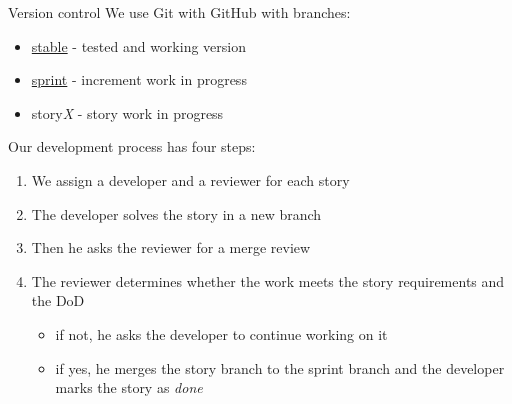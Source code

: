 \documentclass{beamer}
\begin{document}
\begin{frame}{Version control}
  We use Git with GitHub with branches:

  \begin{itemize}
  \item \href{https://github.com/smarisa/sdpt11}{stable} - tested and working version
  \item \href{https://github.com/smarisa/sdpt11}{sprint} - increment work in progress
  \item story\emph{X} - story work in progress
  \end{itemize}

  Our development process has four steps:

  \begin{enumerate}
  \item We assign a developer and a reviewer for each story
  \item The developer solves the story in a new branch
  \item Then he asks the reviewer for a merge review
  \item The reviewer determines whether the work meets the story
  requirements and the DoD
    \begin{itemize}
    \item if not, he asks the developer to continue working on it
    \item if yes, he merges the story branch to the sprint branch and
    the developer marks the story as \emph{done}
    \end{itemize}
  \end{enumerate}
\end{frame}
\end{document}
